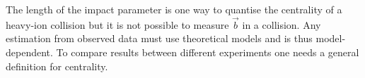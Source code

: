 
%
%

The length of the impact parameter is one way to quantise the centrality of a heavy-ion collision but it is not possible to measure $\vec b$ in a collision. Any estimation from observed data must use theoretical models and is thus model-dependent. To compare results between different experiments one needs a general definition for centrality. %





